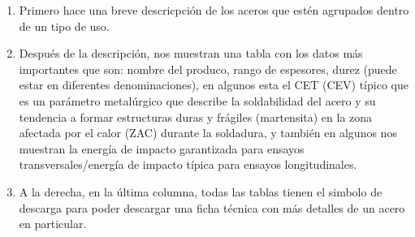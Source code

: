 \documentclass[12pt,a4paper]{article}
\begin{document}
\begin{enumerate}
    \item Primero hace una breve descricpción de los aceros que estén agrupados dentro de un tipo de uso.
    \item Después de la descripción, nos muestran una tabla con los datos más importantes que son: nombre del produco, rango de espesores, durez (puede estar en diferentes denominaciones), en algunos esta el CET (CEV) típico que es un parámetro metalúrgico que describe la soldabilidad del acero y su tendencia a formar estructuras duras y frágiles (martensita) en la zona afectada por el calor (ZAC) durante la soldadura, y también en algunos nos muestran la energía de impacto garantizada para ensayos transversales/energía de impacto típica para ensayos longitudinales.
    \item A la derecha, en la última columna, todas las tablas tienen el simbolo de descarga para poder descargar una ficha técnica con más detalles de un acero en particular.
\end{enumerate}
\end{document}
